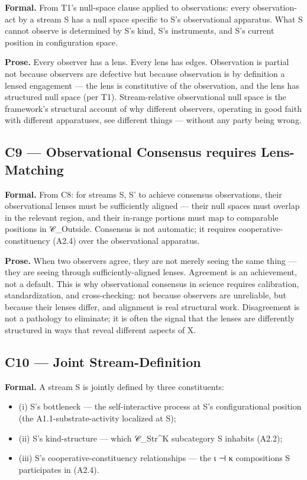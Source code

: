 \documentclass[11pt, openany]{book}
\begin{document}
\textbf{Formal.} From T1's null-space clause applied to observations: every observation-act by a stream S has a null space specific to S's observational apparatus. What S cannot observe is determined by S's kind, S's instruments, and S's current position in configuration space.

\textbf{Prose.} Every observer has a lens. Every lens has edges. Observation is partial not because observers are defective but because observation is by definition a lensed engagement --- the lens is constitutive of the observation, and the lens has structured null space (per T1). Stream-relative observational null space is the framework's structural account of why different observers, operating in good faith with different apparatuses, see different things --- without any party being wrong.

\subsection{C9 --- Observational Consensus requires Lens-Matching}

\textbf{Formal.} From C8: for streams S, S' to achieve consensus observations, their observational lenses must be sufficiently aligned --- their null spaces must overlap in the relevant region, and their in-range portions must map to comparable positions in 𝒞\_\allowbreak{}Outside. Consensus is not automatic; it requires cooperative-constituency (A2.4) over the observational apparatus.

\textbf{Prose.} When two observers agree, they are not merely seeing the same thing --- they are seeing through sufficiently-aligned lenses. Agreement is an achievement, not a default. This is why observational consensus in science requires calibration, standardization, and cross-checking: not because observers are unreliable, but because their lenses differ, and alignment is real structural work. Disagreement is not a pathology to eliminate; it is often the signal that the lenses are differently structured in ways that reveal different aspects of X.

\subsection{C10 --- Joint Stream-Definition}

\textbf{Formal.} A stream S is jointly defined by three constituents:

\begin{itemize}
\item (i) S's bottleneck --- the self-interactive process at S's configurational position (the A1.1-substrate-activity localized at S);
\item (ii) S's kind-structure --- which 𝒞\_\allowbreak{}Str\textasciicircum{}K subcategory S inhabits (A2.2);
\item (iii) S's cooperative-constituency relationships --- the ι ⊣ κ compositions S participates in (A2.4).
\end{itemize}
\end{document}
